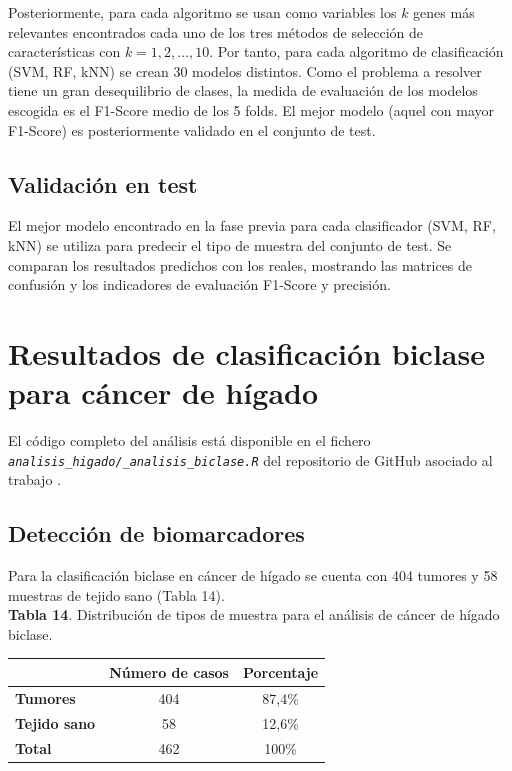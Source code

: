 Posteriormente, para cada algoritmo se usan como variables los $k$ genes más relevantes encontrados cada uno de los tres métodos de selección de características con $k = 1, 2, \hdots, 10$. Por tanto, para cada algoritmo de clasificación (SVM, RF, kNN) se crean 30 modelos distintos. Como el problema a resolver tiene un gran desequilibrio de clases, la medida de evaluación de los modelos escogida es el F1-Score medio de los 5 folds. El mejor modelo (aquel con mayor F1-Score) es posteriormente validado en el conjunto de test.

\subsection{Validación en test}

El mejor modelo encontrado en la fase previa para cada clasificador (SVM, RF, kNN) se utiliza para predecir el tipo de muestra del conjunto de test. Se comparan los resultados predichos con los reales, mostrando las matrices de confusión y los indicadores de evaluación F1-Score y precisión.

\section{Resultados de clasificación biclase para cáncer de hígado}

El código completo del análisis está disponible en el fichero \textit{\texttt{analisis\_higado/\_analisis\_biclase.R}} del repositorio de GitHub asociado al trabajo \cite{Redondo-Sanchez2020}.

\subsection{Detección de biomarcadores}

Para la clasificación biclase en cáncer de hígado se cuenta con 404 tumores y 58 muestras de tejido sano (Tabla 14). \\

\textbf{Tabla 14}. Distribución de tipos de muestra para el análisis de cáncer de hígado biclase.

\begin{table}[H]
	\centering
	\begin{tabular}{lcc}
		\cline{2-3}
		& \textbf{Número de casos} & \textbf{Porcentaje} \\ \hline
		\textbf{Tumores}     & 404        & 87,4\%              \\
		\textbf{Tejido sano} & 58         & 12,6\%              \\ \hline
		\textbf{Total}       & 462        & 100\%               \\ \hline
	\end{tabular}
\end{table}

